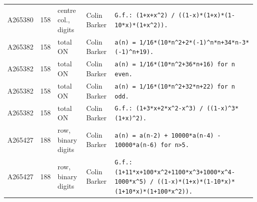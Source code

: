 \documentclass[11pt]{article}
\theoremstyle{definition}
\theoremstyle{remark}
\begin{document}
{\begin{longtable}{p{1.3cm}p{0.7cm}p{2.4cm}p{2.3cm}p{7.3cm}}
A265380 & 158 & centre col., digits & Colin Barker & \texttt{G.f.: \allowbreak{}(1+\allowbreak{}x+\allowbreak{}x\^{}2)\allowbreak{} \allowbreak{}/\allowbreak{} \allowbreak{}((1-\allowbreak{}x)\allowbreak{}*\allowbreak{}(1+\allowbreak{}x)\allowbreak{}*\allowbreak{}(1-\allowbreak{}10*\allowbreak{}x)\allowbreak{}*\allowbreak{}(1+\allowbreak{}x\^{}2)\allowbreak{})\allowbreak{}.} \\
A265382 & 158 & total ON & Colin Barker & \texttt{a(n)\allowbreak{} \allowbreak{}=\allowbreak{} \allowbreak{}1/\allowbreak{}16*\allowbreak{}(10*\allowbreak{}n\^{}2+\allowbreak{}2*\allowbreak{}(-\allowbreak{}1)\allowbreak{}\^{}n*\allowbreak{}n+\allowbreak{}34*\allowbreak{}n-\allowbreak{}3*\allowbreak{}(-\allowbreak{}1)\allowbreak{}\^{}n+\allowbreak{}19)\allowbreak{}.} \\
A265382 & 158 & total ON & Colin Barker & \texttt{a(n)\allowbreak{} \allowbreak{}=\allowbreak{} \allowbreak{}1/\allowbreak{}16*\allowbreak{}(10*\allowbreak{}n\^{}2+\allowbreak{}36*\allowbreak{}n+\allowbreak{}16)\allowbreak{} \allowbreak{}for \allowbreak{}n \allowbreak{}even.} \\
A265382 & 158 & total ON & Colin Barker & \texttt{a(n)\allowbreak{} \allowbreak{}=\allowbreak{} \allowbreak{}1/\allowbreak{}16*\allowbreak{}(10*\allowbreak{}n\^{}2+\allowbreak{}32*\allowbreak{}n+\allowbreak{}22)\allowbreak{} \allowbreak{}for \allowbreak{}n \allowbreak{}odd.} \\
A265382 & 158 & total ON & Colin Barker & \texttt{G.f.: \allowbreak{}(1+\allowbreak{}3*\allowbreak{}x+\allowbreak{}2*\allowbreak{}x\^{}2-\allowbreak{}x\^{}3)\allowbreak{} \allowbreak{}/\allowbreak{} \allowbreak{}((1-\allowbreak{}x)\allowbreak{}\^{}3*\allowbreak{}(1+\allowbreak{}x)\allowbreak{}\^{}2)\allowbreak{}.} \\
A265427 & 188 & row, binary digits & Colin Barker & \texttt{a(n)\allowbreak{} \allowbreak{}=\allowbreak{} \allowbreak{}a(n-\allowbreak{}2)\allowbreak{} \allowbreak{}+\allowbreak{} \allowbreak{}10000*\allowbreak{}a(n-\allowbreak{}4)\allowbreak{} \allowbreak{}-\allowbreak{} \allowbreak{}10000*\allowbreak{}a(n-\allowbreak{}6)\allowbreak{} \allowbreak{}for \allowbreak{}n>5.} \\
A265427 & 188 & row, binary digits & Colin Barker & \texttt{G.f.: \allowbreak{}(1+\allowbreak{}11*\allowbreak{}x+\allowbreak{}100*\allowbreak{}x\^{}2+\allowbreak{}1100*\allowbreak{}x\^{}3+\allowbreak{}1000*\allowbreak{}x\^{}4-\allowbreak{}1000*\allowbreak{}x\^{}5)\allowbreak{} \allowbreak{}/\allowbreak{} \allowbreak{}((1-\allowbreak{}x)\allowbreak{}*\allowbreak{}(1+\allowbreak{}x)\allowbreak{}*\allowbreak{}(1-\allowbreak{}10*\allowbreak{}x)\allowbreak{}*\allowbreak{}(1+\allowbreak{}10*\allowbreak{}x)\allowbreak{}*\allowbreak{}(1+\allowbreak{}100*\allowbreak{}x\^{}2)\allowbreak{})\allowbreak{}.} \\

\end{longtable}}
\end{document}
